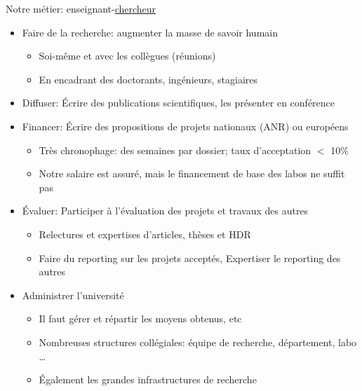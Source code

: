 \documentclass[10pt,final,usepdftitle=false]{beamer}
\begin{document}
\begin{frame}{Notre métier: enseignant-\underline{chercheur}}
\begin{itemize}
\item Faire de la recherche: augmenter la masse de savoir humain
  \begin{itemize}
  \item Soi-même et avec les collègues (réunions)
  \item En encadrant des doctorants, ingénieurs, stagiaires
  \end{itemize}
  \smallskip
\item Diffuser: Écrire des publications scientifiques, les présenter en
  conférence
\item Financer: Écrire des propositions de projets nationaux (ANR) ou européens
  \begin{itemize}
  \item Très chronophage: des semaines par dossier; taux d'acceptation $<$ 10\%
  \item Notre salaire est assuré, mais le financement de base des labos ne
    suffit pas
  \end{itemize}
\item Évaluer: Participer à l'évaluation des projets et travaux des autres
  \begin{itemize}
  \item Relectures et expertises d'articles, thèses et HDR
  \item Faire du reporting sur les projets acceptés, Expertiser le reporting des
    autres
  \end{itemize}
\item Administrer l'université
  \begin{itemize}
  \item Il faut gérer et répartir les moyens obtenus, etc
  \item Nombreuses structures collégiales: {\small équipe de recherche,
      département, labo \ldots}
  \item Également les grandes infrastructures de recherche 
  \end{itemize}

\end{itemize}
\end{frame}
\end{document}
